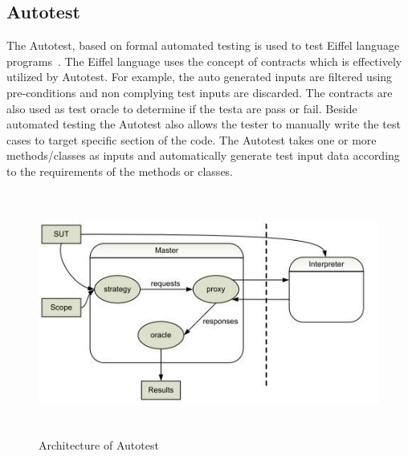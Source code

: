 \subsection{Autotest} \label{autotest_2}
The Autotest, based on formal automated testing is used to test Eiffel language programs~\cite{pacheco2007randoop}. The Eiffel language uses the concept of contracts which is effectively utilized by Autotest. For example, the auto generated inputs are filtered using pre-conditions and non complying test inputs are discarded. The contracts are also used as test oracle to determine if the testa are pass or fail. Beside automated testing the Autotest also allows the tester to manually write the test cases to target specific section of the code. The Autotest takes one or more methods/classes as inputs and automatically generate test input data according to the requirements of the methods or classes.
\bigskip
\begin{figure}[h]
	\centering
	\includegraphics[width=14cm, height=8cm]{chapter2/autotest.png}
	\caption{Architecture of Autotest~\cite{pacheco2007randoop}}
	\label{fig:autotest}
\end{figure}

